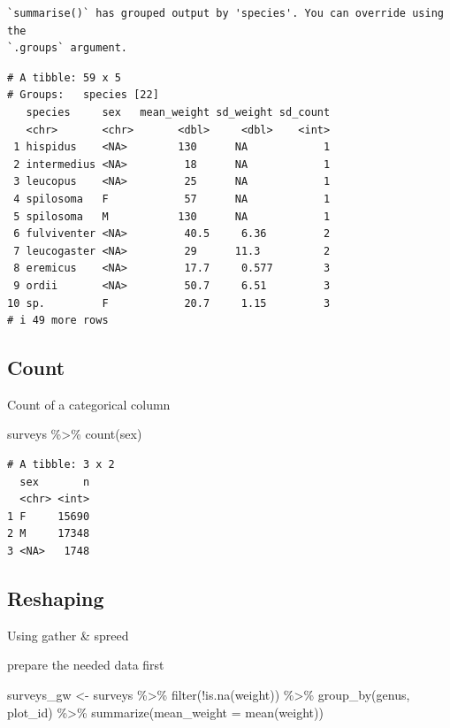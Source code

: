 \documentclass[
  letterpaper,
  DIV=11,
  numbers=noendperiod]{scrreprt}
\newenvironment{Shaded}{\begin{snugshade}}{\end{snugshade}}
\newcommand{\AttributeTok}[1]{\textcolor[rgb]{0.40,0.45,0.13}{#1}}
\newcommand{\FunctionTok}[1]{\textcolor[rgb]{0.28,0.35,0.67}{#1}}
\newcommand{\NormalTok}[1]{\textcolor[rgb]{0.00,0.23,0.31}{#1}}
\newcommand{\OtherTok}[1]{\textcolor[rgb]{0.00,0.23,0.31}{#1}}
\newcommand{\SpecialCharTok}[1]{\textcolor[rgb]{0.37,0.37,0.37}{#1}}
\begin{document}
\begin{verbatim}
`summarise()` has grouped output by 'species'. You can override using the
`.groups` argument.
\end{verbatim}

\begin{verbatim}
# A tibble: 59 x 5
# Groups:   species [22]
   species     sex   mean_weight sd_weight sd_count
   <chr>       <chr>       <dbl>     <dbl>    <int>
 1 hispidus    <NA>        130      NA            1
 2 intermedius <NA>         18      NA            1
 3 leucopus    <NA>         25      NA            1
 4 spilosoma   F            57      NA            1
 5 spilosoma   M           130      NA            1
 6 fulviventer <NA>         40.5     6.36         2
 7 leucogaster <NA>         29      11.3          2
 8 eremicus    <NA>         17.7     0.577        3
 9 ordii       <NA>         50.7     6.51         3
10 sp.         F            20.7     1.15         3
# i 49 more rows
\end{verbatim}

\subsection{Count}\label{count}

Count of a categorical column

\begin{Shaded}
\begin{Highlighting}[]
\NormalTok{surveys }\SpecialCharTok{\%\textgreater{}\%}
    \FunctionTok{count}\NormalTok{(sex)}
\end{Highlighting}
\end{Shaded}

\begin{verbatim}
# A tibble: 3 x 2
  sex       n
  <chr> <int>
1 F     15690
2 M     17348
3 <NA>   1748
\end{verbatim}

\subsection{Reshaping}\label{reshaping}

Using gather \& spreed

prepare the needed data first

\begin{Shaded}
\begin{Highlighting}[]
\NormalTok{surveys\_gw }\OtherTok{\textless{}{-}}\NormalTok{ surveys }\SpecialCharTok{\%\textgreater{}\%}
    \FunctionTok{filter}\NormalTok{(}\SpecialCharTok{!}\FunctionTok{is.na}\NormalTok{(weight)) }\SpecialCharTok{\%\textgreater{}\%}
    \FunctionTok{group\_by}\NormalTok{(genus, plot\_id) }\SpecialCharTok{\%\textgreater{}\%}
    \FunctionTok{summarize}\NormalTok{(}\AttributeTok{mean\_weight =} \FunctionTok{mean}\NormalTok{(weight))}
\end{Highlighting}
\end{Shaded}
\end{document}
